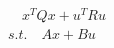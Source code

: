 \documentclass[preview]{standalone}
\begin{document}
\begin{align*}
\quad x^TQx + u^T R u \\ s.t. \quad Ax + Bu
\end{align*}
\end{document}
